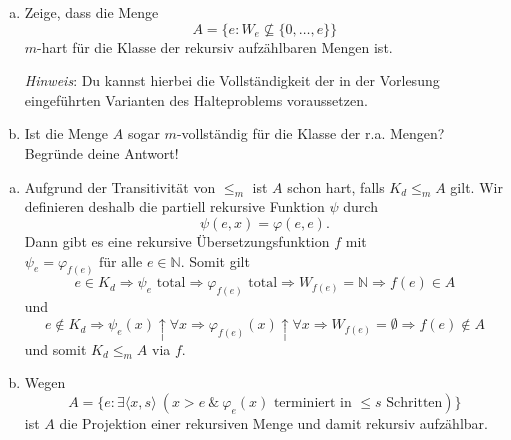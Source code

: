 \documentclass[german,headsepline]{scrartcl}
\theoremstyle{definition}
\begin{document}
	\begin{question}[subtitle={Klausur 2009}]
		\begin{enumerate}[(a)]
			\item Zeige, dass die Menge
				\[A=\{e\colon W_e\not\subseteq\{0,\dots,e\}\}\]
				$m$-hart für die Klasse der rekursiv aufzählbaren Mengen ist.
				
				\textit{Hinweis}: Du kannst hierbei die Vollständigkeit
				der in der Vorlesung eingeführten Varianten des Halteproblems voraussetzen.
			\item Ist die Menge $A$ sogar $m$-vollständig für die Klasse der r.a. Mengen?
				Begründe deine Antwort!
		\end{enumerate}
	\end{question}
	\begin{solution}
		\begin{enumerate}[(a)]
			\item Aufgrund der Transitivität von $\leq_m$ ist $A$ schon hart, falls $K_d\leq_mA$ gilt.
				Wir definieren deshalb die partiell rekursive Funktion $\psi$ durch
				\[\psi(e,x)=\varphi(e,e).\]
				Dann gibt es eine rekursive Übersetzungsfunktion $f$ mit
				$\psi_e=\varphi_{f(e)}\text{ für alle }e\in\mathbb{N}$.
				Somit gilt
				\[e\in K_d\Rightarrow\psi_e\text{ total}\Rightarrow\varphi_{f(e)}\text{ total}
				\Rightarrow W_{f(e)}=\mathbb{N}\Rightarrow f(e)\in A\]
				und
				\[e\notin K_d\Rightarrow\psi_e(x)\uparrow\forall x\Rightarrow\varphi_{f(e)}(x)\uparrow\forall x
				\Rightarrow W_{f(e)}=\emptyset\Rightarrow f(e)\notin A\]
				und somit $K_d\leq_mA$ via $f$.
			\item Wegen
				\[A=\{e\colon\exists\langle x,s\rangle~(x>e~\&~\varphi_e(x)\text{ terminiert in $\leq s$ Schritten})\}\]
				ist $A$ die Projektion einer rekursiven Menge und damit rekursiv aufzählbar.
		\end{enumerate}
	\end{solution}
	
\end{document}

